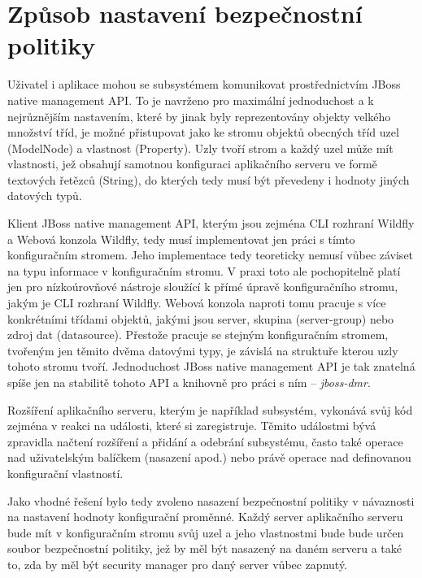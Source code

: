 \section{Způsob nastavení bezpečnostní politiky}

Uživatel i aplikace mohou se subsystémem komunikovat prostřednictvím JBoss native management API. To je navrženo pro maximální jednoduchost a k nejrůznějším nastavením, které by jinak byly reprezentovány objekty velkého množství tříd, je možné přistupovat jako ke stromu objektů obecných tříd uzel (ModelNode) a vlastnost (Property). Uzly tvoří strom a každý uzel může mít vlastnosti, jež obsahují samotnou konfiguraci aplikačního serveru ve formě textových řetězců (String), do kterých tedy musí být převedeny i hodnoty jiných datových typů. \cite{jbossDetypedManagement}

Klient JBoss native management API, kterým jsou zejména CLI rozhraní Wildfly a Webová konzola Wildfly, tedy musí implementovat jen práci s tímto konfiguračním stromem. Jeho implementace tedy teoreticky nemusí vůbec záviset na typu informace v konfiguračním stromu. V praxi toto ale pochopitelně platí jen pro nízkoúrovňové nástroje sloužící k přímé úpravě konfiguračního stromu, jakým je CLI rozhraní Wildfly. Webová konzola naproti tomu pracuje s více konkrétními třídami objektů, jakými jsou server, skupina (server-group) nebo zdroj dat (datasource). Přestože pracuje se stejným konfiguračním stromem, tvořeným jen těmito dvěma datovými typy, je závislá na struktuře kterou uzly tohoto stromu tvoří. Jednoduchost JBoss native management API je tak znatelná spíše jen na stabilitě tohoto API a knihovně pro práci s ním -- {\it jboss-dmr}. \cite{jbossDetypedManagement}

Rozšíření aplikačního serveru, kterým je například subsystém, vykonává svůj kód zejména v reakci na události, které si zaregistruje. Těmito událostmi bývá zpravidla načtení rozšíření a přidání a odebrání subsystému, často také operace nad uživatelským balíčkem (nasazení apod.) nebo právě operace nad definovanou konfigurační vlastností. \cite{wildflyExtending}

Jako vhodné řešení bylo tedy zvoleno nasazení bezpečnostní politiky v návaznosti na nastavení hodnoty konfigurační proměnné. Každý server aplikačního serveru bude mít v konfiguračním stromu svůj uzel a jeho vlastnostmi bude bude určen soubor bezpečnostní politiky, jež by měl být nasazený na daném serveru a také to, zda by měl být security manager pro daný server vůbec zapnutý.

